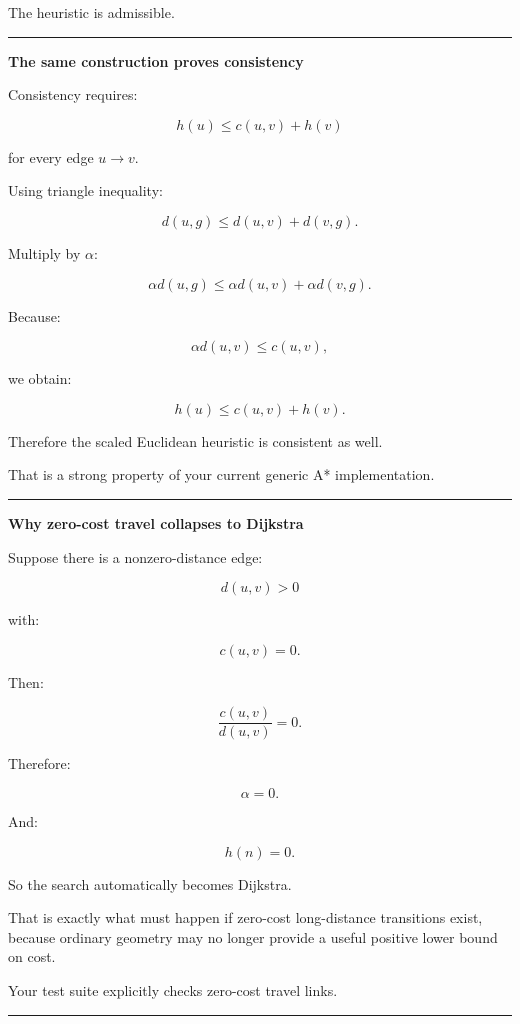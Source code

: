 The heuristic is admissible.

\begin{center}\rule{0.5\linewidth}{0.5pt}\end{center}

\textbf{The same construction proves consistency}

Consistency requires:

\[
\boxed{
h(u)\le c(u,v)+h(v)
}
\]

for every edge \(u\rightarrow v\).

Using triangle inequality:

\[
d(u,g)
\le
d(u,v)+d(v,g).
\]

Multiply by \(\alpha\):

\[
\alpha d(u,g)
\le
\alpha d(u,v)
+
\alpha d(v,g).
\]

Because:

\[
\alpha d(u,v)
\le
c(u,v),
\]

we obtain:

\[
h(u)
\le
c(u,v)+h(v).
\]

Therefore the scaled Euclidean heuristic is consistent as well.

That is a strong property of your current generic A* implementation.

\begin{center}\rule{0.5\linewidth}{0.5pt}\end{center}

\textbf{Why zero-cost travel collapses to Dijkstra}

Suppose there is a nonzero-distance edge:

\[
d(u,v)>0
\]

with:

\[
c(u,v)=0.
\]

Then:

\[
\frac{c(u,v)}{d(u,v)}
=
0.
\]

Therefore:

\[
\alpha=0.
\]

And:

\[
h(n)=0.
\]

So the search automatically becomes Dijkstra.

That is exactly what must happen if zero-cost long-distance transitions exist, because ordinary geometry may no longer provide a useful positive lower bound on cost.

Your test suite explicitly checks zero-cost travel links.

\begin{center}\rule{0.5\linewidth}{0.5pt}\end{center}

